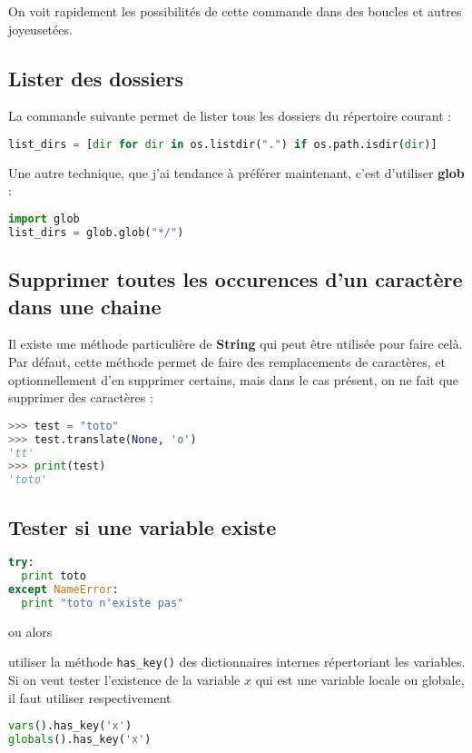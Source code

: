 \documentclass[a4paper,twoside]{article}
\begin{document}
On voit rapidement les possibilités de cette commande dans des boucles et autres joyeusetées.

\subsection{Lister des dossiers}
La commande suivante permet de lister tous les dossiers du répertoire courant :
\begin{lstlisting}[language=python]
list_dirs = [dir for dir in os.listdir(".") if os.path.isdir(dir)]
\end{lstlisting}

Une autre technique, que j'ai tendance à préférer maintenant, c'est d'utiliser \textbf{glob} : 
\begin{lstlisting}[language=python]
import glob
list_dirs = glob.glob("*/")
\end{lstlisting}

\subsection{Supprimer toutes les occurences d'un caractère dans une chaine}
Il existe une méthode particulière de \textbf{String} qui peut être utilisée pour faire celà. Par défaut, cette méthode permet de faire des remplacements de caractères, et optionnellement d'en supprimer certains, mais dans le cas présent, on ne fait que supprimer des caractères : 
\begin{lstlisting}[language=python]
>>> test = "toto"
>>> test.translate(None, 'o')
'tt'
>>> print(test)
'toto'
\end{lstlisting}

\subsection{Tester si une variable existe}
\begin{lstlisting}[language=python]
try:
  print toto
except NameError:
  print "toto n'existe pas"
\end{lstlisting}

ou alors

utiliser la méthode \texttt{has\_key()} des dictionnaires internes répertoriant les variables. Si on veut tester l'existence de la variable $x$  qui est une variable locale ou globale, il faut utiliser respectivement
\begin{lstlisting}[language=python]
vars().has_key('x')
globals().has_key('x')
\end{lstlisting}
\end{document}
